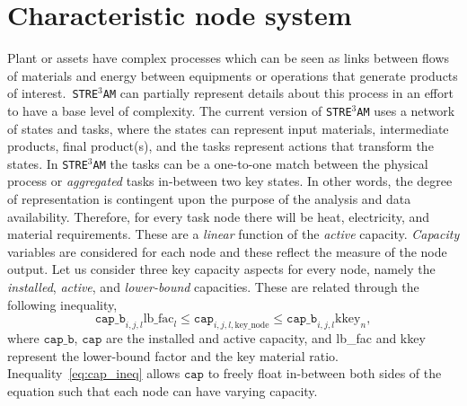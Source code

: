\documentclass{amsbook}
\newcommand{\stream}{\texttt{STRE$^{3}$AM}}
\begin{document}
\section{Characteristic node system}\label{sec:char_sys}
%
Plant or assets have complex processes which can be seen as links between flows
of materials and energy between equipments or operations that generate products
of interest.\ \stream{} can partially represent details about this process in an
effort to have a base level of complexity.  The current version of \stream{}
uses a network of states and tasks, where the states can represent input
materials, intermediate products, final product(s), and the tasks represent
actions that transform the states.  In \stream{} the tasks can be a one-to-one
match between the physical process or \textit{aggregated} tasks in-between two
key states.  In other words, the degree of representation is contingent upon the
purpose of the analysis and data availability. Therefore, for every task node
there will be heat, electricity, and material requirements. These are a
\emph{linear} function of the \emph{active} capacity. \emph{Capacity} variables 
are considered for each node and these reflect the measure of the node output. 
Let us consider three key capacity aspects for every node, namely the
\emph{installed}, \emph{active}, and \emph{lower-bound} capacities. These are
related through the following inequality,
\begin{equation}\label{eq:cap_ineq}
    \mathtt{cap\_b}_{i,j,l} \text{lb\_fac}_{l} 
    \leq \mathtt{cap}_{i,j,l,\text{key\_node}} 
    \leq \mathtt{cap\_b}_{i,j,l} \text{kkey}_{n},
\end{equation}
%
where $\mathtt{cap\_b}$, $\mathtt{cap}$ are the installed and active capacity,
and lb\_fac and kkey represent the lower-bound factor and the key material
ratio. Inequality~\eqref{eq:cap_ineq} allows $\mathtt{cap}$ to freely float
in-between both sides of the equation such that each node can have varying
capacity.  
\end{document}
